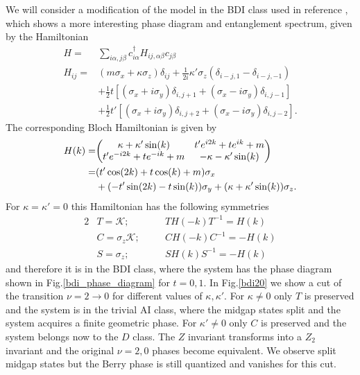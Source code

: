 \documentclass[prb,twocolumn,amsmath,longbibliography,amssymb,superscriptaddress]{revtex4-1}
\begin{document}
We will consider a modification of the model in the BDI class used in reference \cite{Song2014}, which shows a more interesting phase diagram and entanglement spectrum, given by the Hamiltonian
\begin{align}
H =& \sum_{i\alpha,j\beta} c_{i\alpha}^\dagger H_{ij,\alpha \beta} c_{j\beta} \\
H_{ij} =& (m \sigma_x + \kappa \sigma_z)\delta_{ij}  + \frac{1}{2i}\kappa'\sigma_z (\delta_{i-j,1}-\delta_{i-j,-1})\\
&+ \frac{1}{2} t \left[(\sigma_x + i \sigma_y)\delta_{i,j+1} + (\sigma_x - i \sigma_y) \delta_{i,j-1} \right] \\
&+  \frac{1}{2} t' \left[(\sigma_x + i \sigma_y)\delta_{i,j+2} + (\sigma_x - i \sigma_y) \delta_{i,j-2} \right].
\label{bdi_model}
\end{align}
The corresponding Bloch Hamiltonian is given by
\begin{align*}
H(k)=&\mqty( \kappa + \kappa' \sin(k) & t' e^{i2k} + t e^{ik}+m \\t' e^{-i2k} + t e^{-ik}+m & -\kappa-\kappa' \sin(k)  ) \\
=& (t' \cos(2k)+t\cos(k)+m)\sigma_x \\
&+ (-t' \sin(2k)-t\sin(k))\sigma_y + (\kappa+\kappa'\sin(k)) \sigma_z.
\end{align*}
For $\kappa = \kappa' = 0$ this Hamiltonian has the following symmetries
\begin{alignat*}{2}
&T = \mathcal{K} ; \quad &&T H(-k) T^{-1} = H(k) \\
&C = \sigma_z\mathcal{K} ; \quad &&C H(-k) C^{-1} = -H(k) \\
&S = \sigma_z ; \quad &&S H(k)S^{-1} = -H(k) 
\end{alignat*}
and therefore it is in the BDI class, where the system has the phase diagram shown in Fig.\ref{bdi_phase_diagram} for $t=0,1$. In Fig.\ref{bdi20} we show a cut of the transition $\nu = 2 \rightarrow 0$ for different values of $\kappa,\kappa'$. For $\kappa \neq 0$ only $T$ is preserved and the system is in the trivial AI class, where the midgap states split and the system acquires a finite geometric phase. For $\kappa' \neq 0$ only $C$ is preserved and the system belongs now to the $D$ class. The $Z$ invariant transforms into a $Z_2$ invariant and the original $\nu = 2,0$ phases become equivalent. We observe split midgap states but the Berry phase is still quantized and vanishes for this cut.
\end{document}
